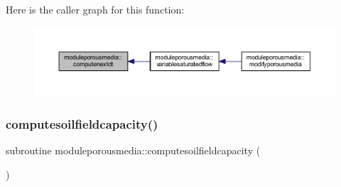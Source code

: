 Here is the caller graph for this function\+:\nopagebreak
\begin{figure}[H]
\begin{center}
\leavevmode
\includegraphics[width=350pt]{namespacemoduleporousmedia_ae1f8e4af55c2c1a3cad5db62a53c9041_icgraph}
\end{center}
\end{figure}
\mbox{\label{namespacemoduleporousmedia_a5bc710495ce11815ae382078999351b3}} 
\subsubsection{\texorpdfstring{computesoilfieldcapacity()}{computesoilfieldcapacity()}}
{\footnotesize\ttfamily subroutine moduleporousmedia\+::computesoilfieldcapacity (\begin{DoxyParamCaption}{ }\end{DoxyParamCaption})\hspace{0.3cm}{\ttfamily [private]}}

